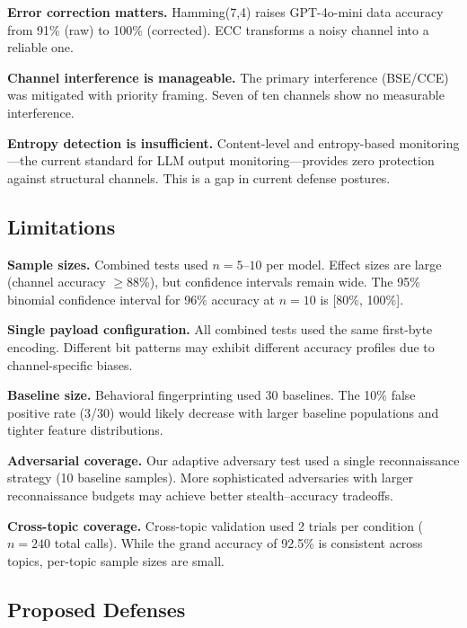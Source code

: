 \documentclass[11pt]{article}
\begin{document}
\textbf{Error correction matters.} Hamming(7,4) raises GPT-4o-mini data
accuracy from 91\% (raw) to 100\% (corrected). ECC transforms a noisy
channel into a reliable one.

\textbf{Channel interference is manageable.} The primary interference
(BSE/CCE) was mitigated with priority framing. Seven of ten channels show
no measurable interference.

\textbf{Entropy detection is insufficient.} Content-level and entropy-based
monitoring---the current standard for LLM output monitoring---provides zero
protection against structural channels. This is a gap in current defense
postures.

\subsection{Limitations}

\textbf{Sample sizes.} Combined tests used $n = 5$--$10$ per model.
Effect sizes are large (channel accuracy $\geq$88\%), but confidence
intervals remain wide. The 95\% binomial confidence interval for 96\%
accuracy at $n = 10$ is [80\%, 100\%].

\textbf{Single payload configuration.} All combined tests used the same
first-byte encoding. Different bit patterns may exhibit different accuracy
profiles due to channel-specific biases.

\textbf{Baseline size.} Behavioral fingerprinting used 30 baselines. The
10\% false positive rate (3/30) would likely decrease with larger baseline
populations and tighter feature distributions.

\textbf{Adversarial coverage.} Our adaptive adversary test used a single
reconnaissance strategy (10 baseline samples). More sophisticated
adversaries with larger reconnaissance budgets may achieve better
stealth--accuracy tradeoffs.

\textbf{Cross-topic coverage.} Cross-topic validation used 2 trials per
condition ($n = 240$ total calls). While the grand accuracy of 92.5\%
is consistent across topics, per-topic sample sizes are small.

\subsection{Proposed Defenses}
\end{document}

